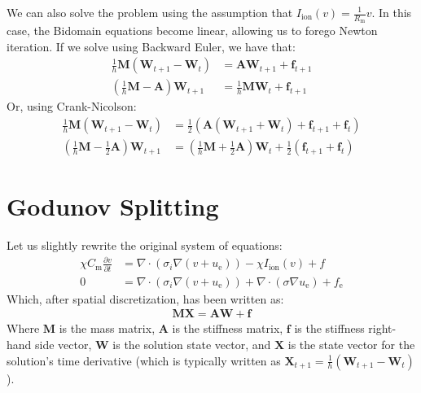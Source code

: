 \documentclass{article}
\newcommand{\bvec}[1]{\boldsymbol{#1}}
\newcommand{\bmat}[1]{\boldsymbol{#1}}
\begin{document}
We can also solve the problem using the assumption that $I_\text{ion}(v) = \frac{1}{R_\text{m}} v$.
In this case, the Bidomain equations become linear, allowing us to forego Newton iteration.
If we solve using Backward Euler, we have that:
\begin{align*}
    \frac{1}{h} \bmat{M} (\bvec{W}_{t + 1} - \bvec{W}_t) & = \bmat{A} \bvec{W}_{t + 1} + \bvec{f}_{t + 1} \\
    (\frac{1}{h} \bmat{M} - \bmat{A}) \bvec{W}_{t + 1} & = \frac{1}{h} \bmat{M} \bvec{W}_t + \bvec{f}_{t + 1}
\end{align*}
\noindent Or, using Crank-Nicolson:
\begin{align*}
    \frac{1}{h} \bmat{M} (\bvec{W}_{t + 1} - \bvec{W}_t)
        & = \frac{1}{2} (\bmat{A} (\bvec{W}_{t + 1} + \bvec{W}_t) + \bvec{f}_{t + 1} + \bvec{f}_t) \\
    (\frac{1}{h} \bmat{M} - \frac{1}{2} \bmat{A}) \bvec{W}_{t + 1}
        & = (\frac{1}{h} \bmat{M} + \frac{1}{2} \bmat{A}) \bvec{W}_t + \frac{1}{2} (\bvec{f}_{t + 1} + \bvec{f}_t)
\end{align*}

\newpage

\section{Godunov Splitting}

Let us slightly rewrite the original system of equations:
\begin{align*}
    \chi C_\text{m} \frac{\partial v}{\partial t}
        & = \nabla \cdot (\sigma_i \nabla (v + u_\text{e})) - \chi I_\text{ion}(v) + f \\
    0
        & = \nabla \cdot (\sigma_i \nabla (v + u_\text{e})) + \nabla \cdot (\sigma \nabla u_\text{e}) + f_\text{e}
\end{align*}
\noindent Which, after spatial discretization, has been written as:
\begin{align*}
    \bmat{M} \bvec{X} = \bmat{A} \bvec{W} + \bvec{f}
\end{align*}
\noindent Where $\bmat{M}$ is the mass matrix,
$\bmat{A}$ is the stiffness matrix,
$\bvec{f}$ is the stiffness right-hand side vector,
$\bvec{W}$ is the solution state vector,
and $\bvec{X}$ is the state vector for the solution's time derivative
(which is typically written as $\bvec{X}_{t + 1} = \frac{1}{h}(\bvec{W}_{t + 1} - \bvec{W}_t)$).
\end{document}
